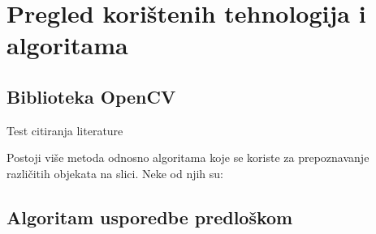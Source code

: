 \newpage
\setcounter{figure}{0}

\section{Pregled korištenih tehnologija i algoritama} %
\label{sec:Tehnologija i teorija}

\subsection{Biblioteka OpenCV} %
\label{sub:Biblioteka OpenCV}

Test citiranja literature~\cite{opencv_library}

Postoji više metoda odnosno algoritama koje se koriste za prepoznavanje
različitih objekata na slici. Neke od njih su:


\subsection{Algoritam usporedbe predloškom} %
\label{sub:Algoritam usporedbe predloškom}



